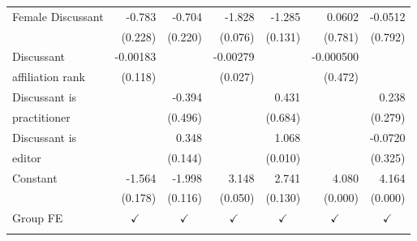 {\begin{tabular}{l*{6}{D{.}{.}{-1}}}
\addlinespace
Female Discussant 	&         -0.783         	&         -0.704         	&         -1.828\sym{*}  	&         -1.285         	&         0.0602         	&        -0.0512         \\
                    	&        (0.228)         	&        (0.220)         	&        (0.076)         	&        (0.131)         	&        (0.781)         	&        (0.792)         \\
\addlinespace
Discussant          	&       -0.00183         	&                        	&       -0.00279\sym{**} 	&                        	&      -0.000500         	&                        \\
affiliation rank    	&        (0.118)         	&                        	&        (0.027)         	&                        	&        (0.472)         	&                        \\
\addlinespace
Discussant is       	&                        	&         -0.394         	&                        	&          0.431         	&                        	&          0.238         \\
practitioner      	&                        	&        (0.496)         	&                        	&        (0.684)         	&                        	&        (0.279)         \\
\addlinespace
Discussant is       	&                        	&          0.348         	&                        	&          1.068\sym{***}	&                        	&        -0.0720         \\
editor            	&                        	&        (0.144)         	&                        	&        (0.010)         	&                        	&        (0.325)         \\
\addlinespace
Constant            	&         -1.564         	&         -1.998         	&          3.148\sym{**} 	&          2.741         	&          4.080\sym{***}	&          4.164\sym{***}\\
                    	&        (0.178)         	&        (0.116)         	&        (0.050)         	&        (0.130)         	&        (0.000)         	&        (0.000)         \\
\addlinespace
Group FE            	&         	&         	&         	&         	&         	&         \\
\addlinespace

\end{tabular}}
